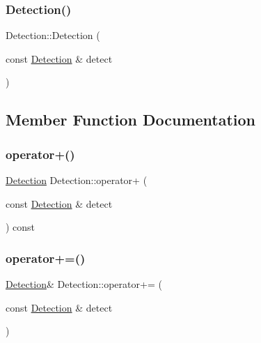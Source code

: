 \subsubsection{\texorpdfstring{Detection()}{Detection()}\hspace{0.1cm}{\footnotesize\ttfamily [3/3]}}
{\footnotesize\ttfamily Detection\+::\+Detection (\begin{DoxyParamCaption}\item[{const \hyperlink{struct_detection}{Detection} \&}]{detect }\end{DoxyParamCaption})\hspace{0.3cm}{\ttfamily [inline]}}



\subsection{Member Function Documentation}
\mbox{\label{struct_detection_a69eb856cdc75d10db04c169d557815d1}} 
\subsubsection{\texorpdfstring{operator+()}{operator+()}}
{\footnotesize\ttfamily \hyperlink{struct_detection}{Detection} Detection\+::operator+ (\begin{DoxyParamCaption}\item[{const \hyperlink{struct_detection}{Detection} \&}]{detect }\end{DoxyParamCaption}) const}

\mbox{\label{struct_detection_a51bbeca262f4c0328f85eb9b32e97020}} 
\subsubsection{\texorpdfstring{operator+=()}{operator+=()}}
{\footnotesize\ttfamily \hyperlink{struct_detection}{Detection}\& Detection\+::operator+= (\begin{DoxyParamCaption}\item[{const \hyperlink{struct_detection}{Detection} \&}]{detect }\end{DoxyParamCaption})}

\mbox{\label{struct_detection_ae156f11b8c51921c6c785a921fc43e85}} 
